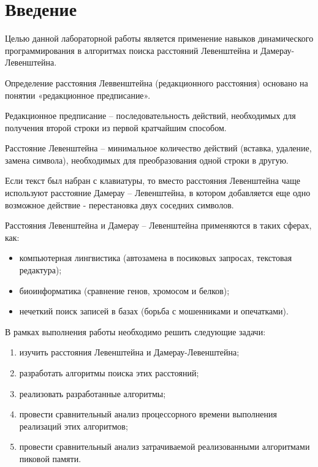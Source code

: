 \chapter*{Введение}

Целью данной лабораторной работы является применение навыков динамического программирования в алгоритмах поиска расстояний Левенштейна и Дамерау-Левенштейна.

Определение расстояния Леввенштейна (редакционного расстояния) основано на понятии «редакционное предписание».

Редакционное предписание – последовательность действий, необходимых для получения второй строки из первой  кратчайшим способом. 

Расстояние Левенштейна – минимальное количество действий (вставка, удаление, замена символа), необходимых для преобразования одной строки в другую. 

Если текст был набран с клавиатуры, то вместо расстояния Левенштейна чаще используют расстояние Дамерау – Левенштейна, в котором добавляется еще одно возможное действие - перестановка двух соседних символов.~\cite{Passenger}

Расстояния Левенштейна и Дамерау – Левенштейна применяются в таких сферах, как: 
\begin{itemize}
	\item компьютерная лингвистика (автозамена в посиковых запросах, текстовая редактура);
	\item биоинформатика (сравнение генов, хромосом и белков);
	\item нечеткий поиск записей в базах (борьба с мошенниками и опечатками).
\end{itemize}

В рамках выполнения работы необходимо решить следующие задачи: 
\begin{enumerate}[label={\arabic*)}]
	\item изучить расстояния Левенштейна и Дамерау-Левенштейна;
	\item разработать алгоритмы поиска этих расстояний;
	\item реализовать разработанные алгоритмы;
	\item провести сравнительный анализ процессорного времени выполнения реализаций этих алгоритмов;
	\item провести сравнительный анализ затрачиваемой реализованными алгоритмами пиковой памяти.
\end{enumerate}
